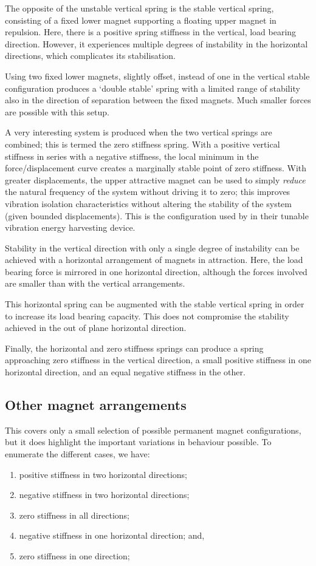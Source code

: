 The opposite of the unstable vertical spring is the stable vertical
spring, consisting of a fixed lower magnet supporting a floating upper
magnet in repulsion. Here, there is a positive spring stiffness in the
vertical, load bearing direction. However, it experiences multiple
degrees of instability in the horizontal directions, which complicates
its stabilisation.

Using two fixed lower magnets, slightly offset, instead of one in the
vertical stable configuration produces a `double stable' spring with a
limited range of stability also in the direction of separation between
the fixed magnets. Much smaller forces are possible with this setup.

A very interesting system is produced when the two vertical springs
are combined; this is termed the zero stiffness spring. With a
positive vertical stiffness in series with a negative stiffness, the
local minimum in the force/displacement curve creates a marginally
stable point of zero stiffness. With greater displacements, the upper
attractive magnet can be used to simply \emph{reduce} the natural
frequency of the system without driving it to zero; this improves
vibration isolation characteristics without altering the stability of
the system (given bounded displacements). This is the configuration
used by \textcite{challa2008} in their tunable vibration energy
harvesting device.

Stability in the vertical direction with only a single degree of
instability can be achieved with a horizontal arrangement of magnets
in attraction. Here, the load bearing force is mirrored in one
horizontal direction, although the forces involved are smaller than
with the vertical arrangements.

This horizontal spring can be augmented with the stable vertical
spring in order to increase its load bearing capacity. This does not
compromise the stability achieved in the out of plane horizontal
direction.

Finally, the horizontal and zero stiffness springs can produce a
spring approaching zero stiffness in the vertical direction, a small positive
stiffness in one horizontal direction, and an equal negative stiffness
in the other.

\subsection{Other magnet arrangements}

This covers only a small selection of possible permanent magnet
configurations, but it does highlight the important variations in
behaviour possible. To enumerate the different cases, we have:
\begin{enumerate}
\item positive stiffness in two horizontal directions;
\item negative stiffness in two horizontal directions;
\item zero stiffness in all directions;
\item negative stiffness in one horizontal direction; and,
\item zero stiffness in one direction;
\end{enumerate}

